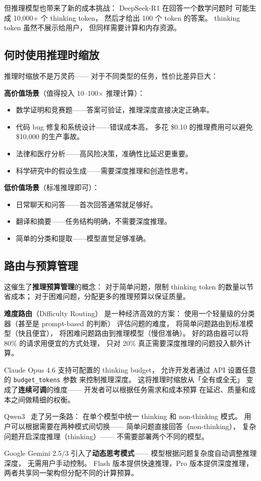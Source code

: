但推理模型也带来了新的成本挑战：
DeepSeek-R1 在回答一个数学问题时
可能生成 10,000+ 个 thinking token，
然后才给出 100 个 token 的答案。
thinking token 虽然不展示给用户，
但同样需要计算和内存资源。

\subsection{何时使用推理时缩放}

推理时缩放不是万灵药——
对于不同类型的任务，性价比差异巨大：

\textbf{高价值场景}（值得投入 10--100$\times$ 推理计算）：
\begin{itemize}[noitemsep]
  \item 数学证明和竞赛题——答案可验证，推理深度直接决定正确率。
  \item 代码 bug 修复和系统设计——错误成本高，
        多花 \$0.10 的推理费用可以避免 \$10,000 的生产事故。
  \item 法律和医疗分析——高风险决策，准确性比延迟更重要。
  \item 科学研究中的假设生成——需要深度推理和创造性思考。
\end{itemize}

\textbf{低价值场景}（标准推理即可）：
\begin{itemize}[noitemsep]
  \item 日常聊天和问答——首次回答通常就足够好。
  \item 翻译和摘要——任务结构明确，不需要深度推理。
  \item 简单的分类和提取——模型直觉足够准确。
\end{itemize}

\subsection{路由与预算管理}

这催生了\textbf{推理预算管理}的概念：
对于简单问题，限制 thinking token 的数量以节省成本；
对于困难问题，分配更多的推理预算以保证质量。

\textbf{难度路由}（Difficulty Routing）
是一种经济高效的方案：
使用一个轻量级的分类器（甚至是 prompt-based 的判断）
评估问题的难度，
将简单问题路由到标准模型（快且便宜），
将困难问题路由到推理模型（慢但准确）。
好的路由器可以将 80\% 的请求用便宜的方式处理，
只对 20\% 真正需要深度推理的问题投入额外计算。

\begin{corebox}
Claude Opus 4.6 支持可配置的 thinking budget，
允许开发者通过 API 设置任意的 \texttt{budget\_tokens} 参数
来控制推理深度。
这将推理时缩放从「全有或全无」
变成了\textbf{连续可调}的维度——
开发者可以根据任务需求和成本预算
在延迟、质量和成本之间做精细的权衡。

Qwen3~\cite{qwen2025qwen3} 走了另一条路：
在单个模型中统一 thinking 和 non-thinking 模式。
用户可以根据需要在两种模式间切换——
简单问题直接回答（non-thinking），
复杂问题开启深度推理（thinking）——
不需要部署两个不同的模型。

Google Gemini 2.5/3 引入了\textbf{动态思考模式}——
模型根据问题复杂度自动调整推理深度，
无需用户手动控制。
Flash 版本提供快速推理，Pro 版本提供深度推理，
两者共享同一架构但分配不同的计算预算。
\end{corebox}

